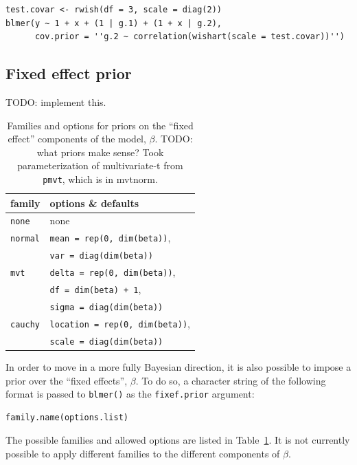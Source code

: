 \documentclass[10pt]{article}
\newcommand{\pkg}[1]{{\fontseries{b}\selectfont #1}}
\newcommand{\code}[1]{\texttt{#1}}
\begin{document}
\begin{verbatim}
test.covar <- rwish(df = 3, scale = diag(2))
blmer(y ~ 1 + x + (1 | g.1) + (1 + x | g.2),
      cov.prior = ''g.2 ~ correlation(wishart(scale = test.covar))'')
\end{verbatim}

\subsection{Fixed effect prior}

TODO: implement this. 

\begin{table}
\begin{center}{\small
\begin{tabular}{ll}
family & options \& defaults \\ \hline
\code{none} & none \\
\code{normal} & \code{mean = rep(0, dim(beta))}, \\
 & \code{var = diag(dim(beta))} \\
\code{mvt} & \code{delta = rep(0, dim(beta))}, \\
& \code{df = dim(beta) + 1}, \\
& \code{sigma = diag(dim(beta))} \\
\code{cauchy} & \code{location = rep(0, dim(beta))}, \\
 & \code{scale = diag(dim(beta))}
\end{tabular}}
\end{center}
\caption{Families and options for priors on the ``fixed effect''
  components of the model, $\beta$. TODO: what priors make sense? Took
parameterization of multivariate-t from \code{pmvt}, which is in \pkg{mvtnorm}.}
\label{tab:fixef_prior_options}
\end{table}

In order to move in a more fully Bayesian direction, it is also
possible to impose a prior over the ``fixed effects'', $\beta$. To do
so, a character string of the following format is passed to
\code{blmer()} as the \code{fixef.prior} argument:

\begin{verbatim}
family.name(options.list)
\end{verbatim}

The possible families and allowed options are listed in
Table~\ref{tab:fixef_prior_options}. It is not currently possible to
apply different families to the different components of $\beta$.
\end{document}
